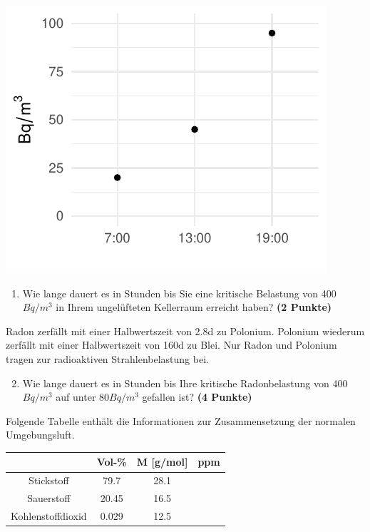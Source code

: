 \documentclass[a4paper, 9pt]{scrartcl}\usepackage[]{graphicx}\usepackage[]{xcolor}
\makeatletter
\def\maxwidth{ %
  \ifdim\Gin@nat@width>\linewidth
    \linewidth
  \else
    \Gin@nat@width
  \fi
}
\newenvironment{knitrout}{}{} %
\makeatother
\begin{document}
\begin{knitrout}
\color{fgcolor}

{\centering \includegraphics[width=\maxwidth]{img/math-10-1} 

}


\end{knitrout}

\vspace{-0.75cm}

\begin{enumerate}
\item Wie lange dauert es in Stunden bis Sie eine kritische Belastung von
  400$Bq/m^3$ in Ihrem ungelüfteten Kellerraum erreicht haben?
  \textbf{(2 Punkte)}
\end{enumerate}

Radon zerfällt mit einer Halbwertszeit von 2.8d zu
Polonium. Polonium wiederum zerfällt mit einer Halbwertszeit von
160d zu Blei. Nur Radon und Polonium tragen zur
radioaktiven Strahlenbelastung bei.

\begin{enumerate}
  \setcounter{enumi}{1}
\item Wie lange dauert es in Stunden bis Ihre kritische Radonbelastung von
  400$Bq/m^3$ auf unter 80$Bq/m^3$ gefallen ist?
  \textbf{(4 Punkte)}
\end{enumerate}

Folgende Tabelle enthält die Informationen zur Zusammensetzung der
normalen Umgebungsluft.

\begin{center}
  \begin{tabular}{ c|c|c|c }
     & Vol-\% & M [g/mol] & ppm \\
    \hline
    Stickstoff & 79.7 & 28.1 &
                                                    \phantom{1000000000000}\strut\\
        \hline
    Sauerstoff & 20.45 & 16.5 &
                                                    \phantom{10000000}\strut\\
        \hline
    Kohlenstoffdioxid & 0.029 & 12.5 & \phantom{10000000}\strut\\     
     \hline
\end{tabular}
\end{center}
\end{document}
